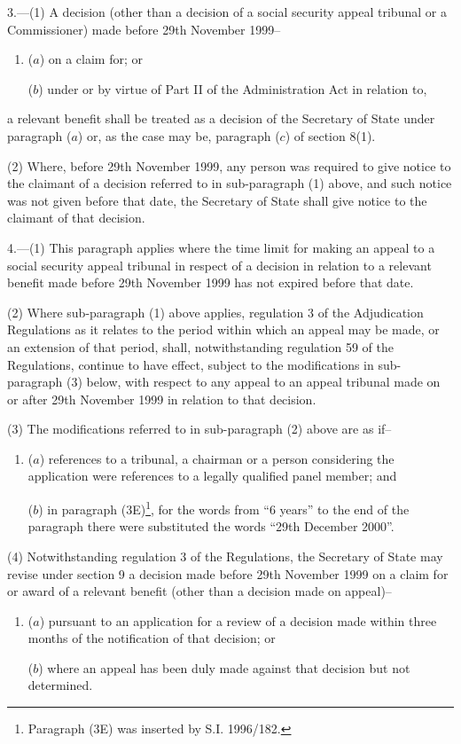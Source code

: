 \documentclass[12pt,a4paper]{article}
\begin{document}
\medskip

3.---(1)  A decision (other than a decision of a social security appeal tribunal or a Commissioner) made before 29th November 1999–
\begin{enumerate}\item[]
($a$) on a claim for; or

($b$) under or by virtue of Part II of the Administration Act in relation to,
\end{enumerate}
a relevant benefit shall be treated as a decision of the Secretary of State under paragraph ($a$)  or, as the case may be, paragraph ($c$)  of section 8(1).

(2) Where, before 29th November 1999, any person was required to give notice to the claimant of a decision referred to in sub-paragraph (1) above, and such notice was not given before that date, the Secretary of State shall give notice to the claimant of that decision.

\medskip

4.---(1)  This paragraph applies where the time limit for making an appeal to a social security appeal tribunal in respect of a decision in relation to a relevant benefit made before 29th November 1999 has not expired before that date.

(2) Where sub-paragraph (1) above applies, regulation 3 of the Adjudication Regulations as it relates to the period within which an appeal may be made, or an extension of that period, shall, notwithstanding regulation 59 of the Regulations, continue to have effect, subject to the modifications in sub-paragraph (3) below, with respect to any appeal to an appeal tribunal made on or after 29th November 1999 in relation to that decision.

(3) The modifications referred to in sub-paragraph (2) above are as if–
\begin{enumerate}\item[]
($a$) references to a tribunal, a chairman or a person considering the application were references to a legally qualified panel member; and

($b$) in paragraph (3E)\footnote{\frenchspacing Paragraph (3E) was inserted by S.I. 1996/182.}, for the words from “6 years” to the end of the paragraph there were substituted the words “29th December 2000”.
\end{enumerate}

(4) Notwithstanding regulation 3 of the Regulations, the Secretary of State may revise under section 9 a decision made before 29th November 1999 on a claim for or award of a relevant benefit (other than a decision made on appeal)–
\begin{enumerate}\item[]
($a$) pursuant to an application for a review of a decision made within three months of the notification of that decision; or

($b$) where an appeal has been duly made against that decision but not determined.
\end{enumerate}
\end{document}
